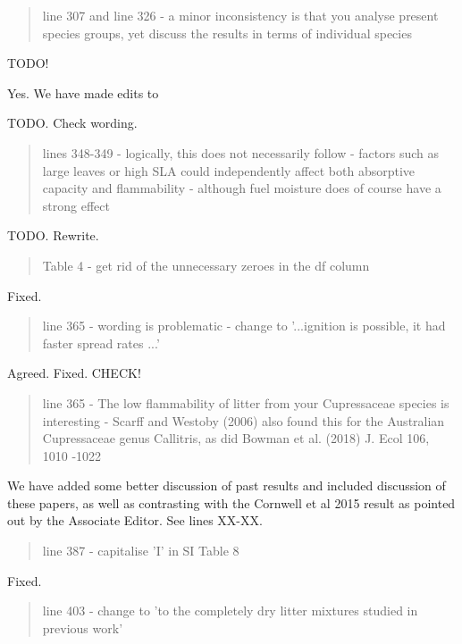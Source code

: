 \documentclass[letterpaper, 12pt]{letter}
\begin{document}
\begin{letter}{}
\begin{quote}
line 307 and line 326 - a minor inconsistency is that you analyse present species groups, yet discuss the results in terms of individual species
\end{quote}

TODO!

Yes. We have made edits to

TODO. Check wording.



\begin{quote}
lines 348-349 - logically, this does not necessarily follow - factors such as large leaves or high SLA could independently affect both absorptive capacity and flammability - although fuel moisture does of course have a strong effect 
\end{quote}

TODO. Rewrite.


\begin{quote}
Table 4 - get rid of the unnecessary zeroes in the df column
\end{quote}

Fixed.

\begin{quote}
line 365 - wording is problematic - change to '...ignition is possible, it had faster spread rates ...'
\end{quote}

Agreed. Fixed. CHECK!

\begin{quote}
line 365 - The low flammability of litter from your Cupressaceae species is interesting - Scarff and Westoby (2006) also found this for the Australian Cupressaceae genus Callitris, as did Bowman et al. (2018) J. Ecol 106, 1010 -1022
\end{quote}

We have added some better discussion of past results and included discussion of these papers, as well as contrasting with the Cornwell et al 2015 result as pointed out by the Associate Editor. See lines XX-XX.

\begin{quote}
line 387 - capitalise 'I' in SI Table  8
\end{quote}

Fixed.

\begin{quote}
line 403 - change to 'to the completely dry litter mixtures studied in previous work'
\end{quote}


\end{letter}
\end{document}
